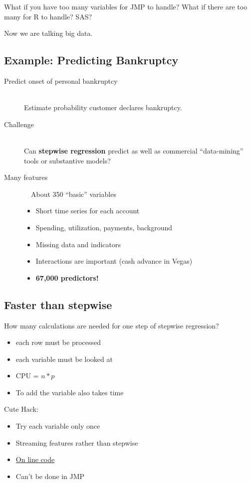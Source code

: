 \documentclass[12pt]{extarticle} %
\begin{document}
What if you have too many variables for JMP to handle?  What if there
are too many for R to handle?  SAS?  

Now we are talking big data.
\subsection{Example: Predicting Bankruptcy  }
\begin{description}

\item[ Predict onset of personal bankruptcy ] \ \\
  Estimate probability customer declares bankruptcy.
  
\item[Challenge] \ \\
  Can {\bf stepwise regression} predict as well as
  commercial ``data-mining'' tools or substantive models?

\item[ Many features ] \ \  About 350 ``basic'' variables
  \begin{itemize}
      \item Short time series for each account
      \item Spending, utilization, payments, background
      \item Missing data and indicators
      \item Interactions are important (cash advance in Vegas)
      \item {\bf 67,000 predictors!}
  \end{itemize}
\end{description}

\subsection{Faster than stepwise}

How many calculations are needed for one step of stepwise regression? 
\begin{itemize}
\item each row must be processed
\item each variable must be looked at
\item CPU = $n * p$
\item To add the variable also takes time
\end{itemize}
Cute Hack:
\begin{itemize}
\item Try each variable only once
\item Streaming features rather than stepwise
\item \href{http://gosset.wharton.upenn.edu/~foster/auction.html}{On line code}
\item Can't be done in JMP
\end{itemize}
\end{document}
